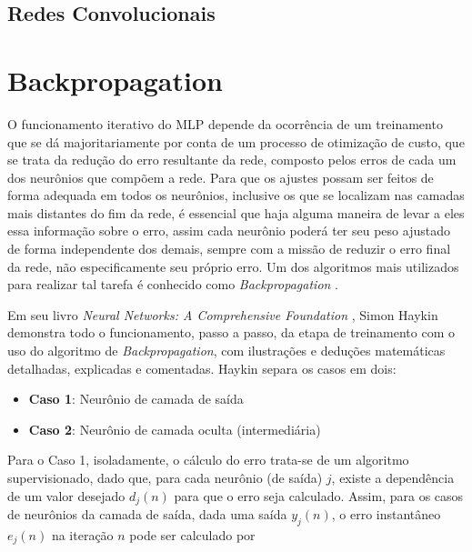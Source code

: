 \subsection{Redes Convolucionais}
\label{subsec:ann_convolutional_nets}










\section{Backpropagation}
\label{sec:ann_backpropagation}

O funcionamento iterativo do MLP depende da ocorrência de um treinamento que se dá majoritariamente por conta de um processo de otimização de custo, que se trata da redução do erro resultante da rede, composto pelos erros de cada um dos neurônios que compõem a rede. Para que os ajustes possam ser feitos de forma adequada em todos os neurônios, inclusive os que se localizam nas camadas mais distantes do fim da rede, é essencial que haja alguma maneira de levar a eles essa informação sobre o erro, assim cada neurônio poderá ter seu peso ajustado de forma independente dos demais, sempre com a missão de reduzir o erro final da rede, não especificamente seu próprio erro. Um dos algoritmos mais utilizados para realizar tal tarefa é conhecido como \textit{Backpropagation} \citep{Rumelhart1986, rumelhart1988parallel}.

Em seu livro \textit{Neural Networks: A Comprehensive Foundation} \citep{haykin1999neural}, Simon Haykin demonstra todo o funcionamento, passo a passo, da etapa de treinamento com o uso do algoritmo de \textit{Backpropagation}, com ilustrações e deduções matemáticas detalhadas, explicadas e comentadas. Haykin separa os casos em dois:

\begin{itemize}
    \item \textbf{Caso 1}: Neurônio de camada de saída
    \item \textbf{Caso 2}: Neurônio de camada oculta (intermediária)
\end{itemize}

Para o Caso 1, isoladamente, o cálculo do erro trata-se de um algoritmo supervisionado, dado que, para cada neurônio (de saída) $j$, existe a dependência de um valor desejado $d_{j}(n)$ para que o erro seja calculado. Assim, para os casos de neurônios da camada de saída, dada uma saída $y_{j}(n)$, o erro instantâneo $e_{j}(n)$ na iteração $n$ pode ser calculado por


